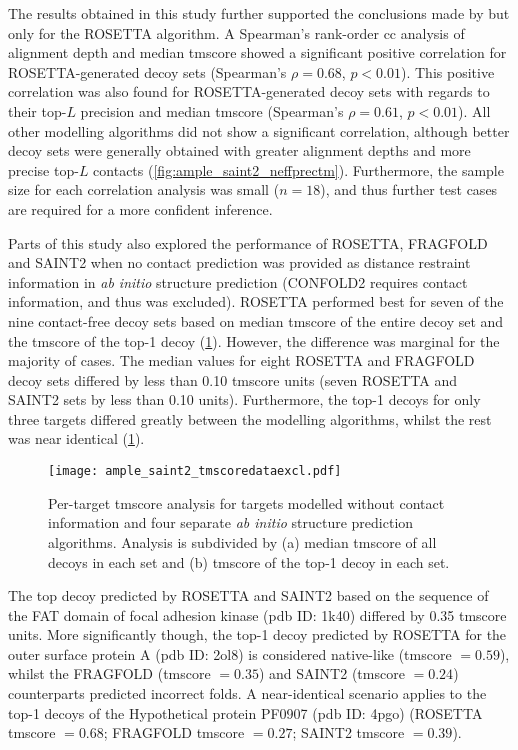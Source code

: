 The results obtained in this study further supported the conclusions made by \textcite{Abriata2018-lu} but only for the ROSETTA algorithm. A Spearman's rank-order \gls{cc} analysis of alignment depth and median \gls{tmscore} showed a significant positive correlation for ROSETTA-generated decoy sets (Spearman's $\rho=0.68$, $p<0.01$). This positive correlation was also found for ROSETTA-generated decoy sets with regards to their top-$L$ precision and median \gls{tmscore} (Spearman's $\rho=0.61$, $p<0.01$). All other modelling algorithms did not show a significant correlation, although better decoy sets were generally obtained with greater alignment depths and more precise top-$L$ contacts (\cref{fig:ample_saint2_neffprectm}). Furthermore, the sample size for each correlation analysis was small ($n=18$), and thus further test cases are required for a more confident inference.

Parts of this study also explored the performance of ROSETTA, FRAGFOLD and SAINT2 when no contact prediction was provided as distance restraint information in \textit{ab initio} structure prediction (CONFOLD2 requires contact information, and thus was excluded). ROSETTA performed best for seven of the nine contact-free decoy sets based on median \gls{tmscore} of the entire decoy set and the \gls{tmscore} of the top-1 decoy (\cref{fig:ample_saint2_tmscoredataexcl}). However, the difference was marginal for the majority of cases. The median values for eight ROSETTA and FRAGFOLD decoy sets differed by less than 0.10 \gls{tmscore} units (seven ROSETTA and SAINT2 sets by less than 0.10 units). Furthermore, the top-1 decoys for only three targets differed greatly between the modelling algorithms, whilst the rest was near identical (\cref{fig:ample_saint2_tmscoredataexcl}).

\begin{figure}[H]
    \centering
    \texttt{[image: ample\_saint2\_tmscoredataexcl.pdf]}
    \caption[TM-score analysis for four modelling algorithms]{Per-target \gls{tmscore} analysis for targets modelled without contact information and four separate \textit{ab initio} structure prediction algorithms. Analysis is subdivided by (a) median \gls{tmscore} of all decoys in each set and (b) \gls{tmscore} of the top-1 decoy in each set.}
    \label{fig:ample_saint2_tmscoredataexcl}
\end{figure}

The top decoy predicted by ROSETTA and SAINT2 based on the sequence of the FAT domain of focal adhesion kinase (\gls{pdb} ID: 1k40) differed by 0.35 \gls{tmscore} units. More significantly though, the top-1 decoy predicted by ROSETTA for the outer surface protein A (\gls{pdb} ID: 2ol8) is considered native-like (\gls{tmscore} $=0.59$), whilst the FRAGFOLD (\gls{tmscore} $=0.35$) and SAINT2 (\gls{tmscore} $=0.24$) counterparts predicted incorrect folds. A near-identical scenario applies to the top-1 decoys of the Hypothetical protein PF0907 (\gls{pdb} ID: 4pgo) (ROSETTA \gls{tmscore} $=0.68$; FRAGFOLD \gls{tmscore} $=0.27$; SAINT2 \gls{tmscore} $=0.39$).

